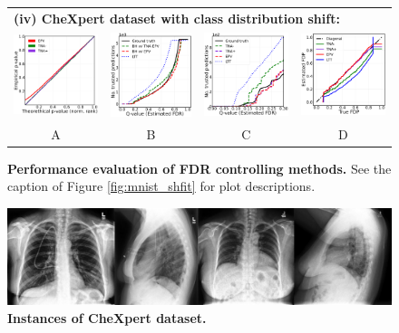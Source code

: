 \documentclass{article}
\begin{document}
\begin{figure}[h!]
\begin{tabular}{cccc}
		\multicolumn{4}{l}{\bf (iv) CheXpert dataset with class distribution shift:}\\	
		\includegraphics[width=0.225\linewidth, height=0.225\linewidth]{img/cnn_QQ_chx_balanced.png} 		&
		\includegraphics[width=0.225\linewidth, height=0.225\linewidth]{img/cnn_chx_balanced_fdr_control.png} & 
		\includegraphics[width=0.225\linewidth, height=0.225\linewidth]{img/cnn_chx_balanced_fdr_control_loc.png} & 
		\includegraphics[width=0.225\linewidth, height=0.225\linewidth]{img/cnn_FDPscat_chx_balanced.png}\\
		A & B & C & D
	\end{tabular}
	\caption{{\bf Performance evaluation of FDR controlling methods.} See the caption of Figure \ref{fig:mnist_shfit} for plot descriptions. }
	\label{fig:I}
\end{figure} 



\begin{figure}[h!]
	\centering
	\includegraphics[width=5.in]{img/chx.png}
	\caption{{\bf Instances of CheXpert dataset.}}
	\label{fig:pcam_example}
\end{figure} 
\end{document}
